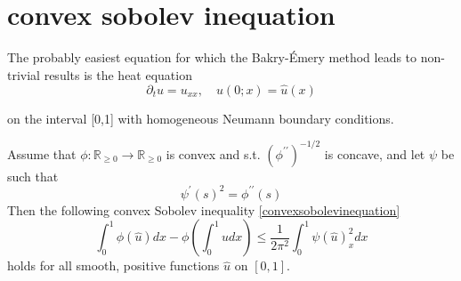 \section{convex sobolev inequation}
The probably easiest equation for which the Bakry-Émery method leads to non-trivial results is the heat equation
\begin{equation}\label{heat-equation}
	\partial_{t} u=u_{x x}, \quad u(0 ; x)=\hat{u}(x)
\end{equation}

on the interval [0,1] with homogeneous Neumann boundary conditions.

\begin{theorem}
	 Assume that $\phi: \mathbb{R}_{\geq 0} \rightarrow \mathbb{R}_{\geq 0}$ is convex and s.t. $\left(\phi^{\prime \prime}\right)^{-1 / 2}$ is concave, and let $\psi$ be such that
	$$
	\psi^{\prime}(s)^{2}=\phi^{\prime \prime}(s)
	$$
	Then the following convex Sobolev inequality \eqref{convexsobolevinequation}
\begin{equation}\label{convexsobolevinequation}
	\int_{0}^{1} \phi(\hat{u}) d x-\phi\left(\int_{0}^{1} \hat{u} d x\right) \leq \frac{1}{2 \pi^{2}} \int_{0}^{1} \psi(\hat{u})_{x}^{2} d x
\end{equation}
	holds for all smooth, positive functions $\hat{u}$ on $[0,1] .$
\end{theorem}

